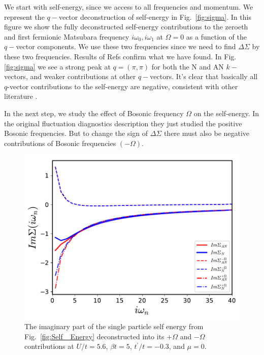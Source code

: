 We start with self-energy, since we access to all frequencies and momentum. We represent the $q-$vector deconstruction of self-energy in Fig.~\ref{fig:sigma}. In this figure we show the fully deconstructed self-energy contributions to the zeroeth and first fermionic Matsubara frequency $i\omega_0 , i\omega_1$  at $\Omega=0$ as a function of the $q-$vector components. We use these two frequencies since we need to find $\Delta \Sigma$ by these two frequencies. Results of Refs \cite{Toschi, Wei} confirm what we have found. In Fig. \ref{fig:sigma} we see a strong peak at $q=(\pi,\pi)$ for both the N and AN $k-$vectors, and weaker contributions at other $q-$vectors. It's clear that basically all $q$-vector contributions to the self-energy are negative, consistent with other literature \cite{Toschi, chen:2017}.




In the next step, we study the effect of Bosonic frequency $\Omega$ on the self-energy. In the original fluctuation diagnostics description \cite{Toschi} they just studied the positive Bosonic frequencies. But to change the sign of $\Delta \Sigma$  there must also be negative contributions of Bosonic frequencies $(-\Omega)$.

\begin{figure}[ht]
\centering
    \includegraphics[width=0.9\linewidth]{fig3/self_energy.pdf}
    
\caption{ The imaginary part of the single particle self energy from Fig.~\ref{fig:Self_ Energy} deconstructed into its  $+\Omega$ and $-\Omega$ contributions at $U/t=5.6$, $\beta t =5$, $t^\prime /t=-0.3$, and $\mu=0$. \label{fig:sum_frequency}}
\end{figure}

